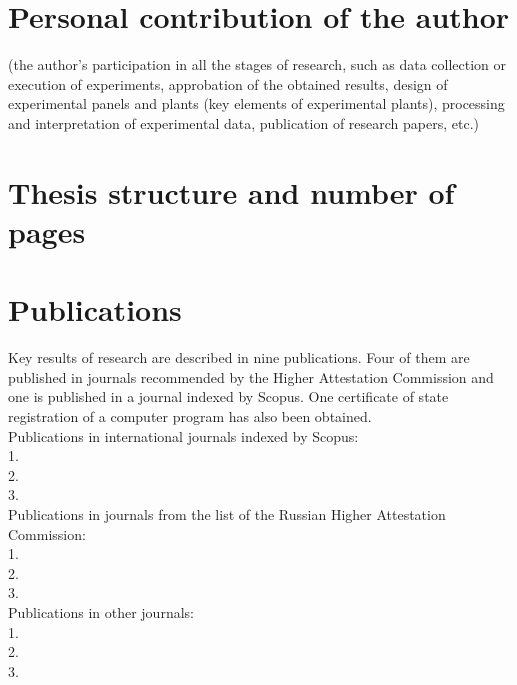 \section*{Personal contribution of the author}
(the author’s participation in all the stages of research, such as data collection or execution of experiments, approbation of the obtained results, design of experimental panels and plants (key elements of experimental plants), processing and interpretation of experimental data, publication of research papers, etc.)

\section*{Thesis structure and number of pages}
\section*{Publications}
Key results of research are described in nine publications. Four of them are published in journals recommended by the Higher Attestation Commission and one is published in a journal indexed by Scopus. One certificate of state registration of a computer program has also been obtained.\\

Publications in international journals indexed by Scopus:\\
1.\\
2.\\
3.\\

Publications in journals from the list of the Russian Higher Attestation Commission:\\
1.\\
2.\\
3.\\

Publications in other journals:\\
1.\\
2.\\
3.
